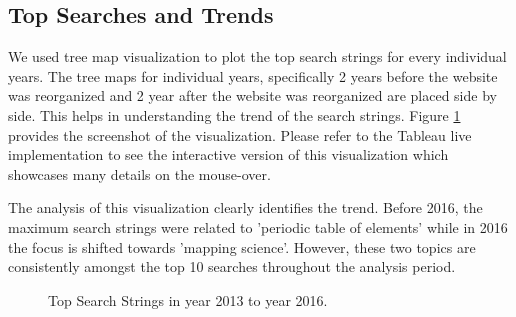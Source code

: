 \subsection{Top Searches and Trends} \label{viztopsearches}
We used tree map visualization to plot the top search strings for every
individual years. The tree maps for individual years, specifically 2 years
before the website was reorganized and 2 year after the website was
reorganized are placed side by side. This helps in understanding the trend of
 the search strings. Figure \ref{fig:topsearches} provides the screenshot of
 the visualization. Please refer to the Tableau live implementation to see
 the interactive version of this visualization which showcases many details
 on the mouse-over.

The analysis of this visualization clearly identifies the trend. Before 2016,
 the maximum search strings were related to 'periodic table of elements'
 while in 2016 the focus is shifted towards 'mapping science'. However, these
   two topics are consistently amongst the top 10 searches throughout the
   analysis period.

\begin{figure}
\centering
{}
\caption{Top Search Strings in year 2013 to year 2016.}
\label{fig:topsearches}
\end{figure}
